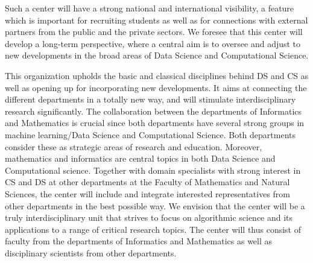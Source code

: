\documentclass[a4paper,10pt]{article}
\begin{document}
 Such a center will have a strong national and international visibility, a feature which is important for recruiting students as well as for  connections with external partners from the public and the private sectors. We foresee that this center will develop a long-term perspective, where a central aim is to oversee and adjust  to new developments in the broad areas of Data Science and Computational Science.





This organization upholds the basic and classical disciplines behind DS and CS as well as  opening up for incorporating  new developments. It aims at connecting the different departments in a totally new way, and will stimulate interdisciplinary research significantly. The collaboration between the departments of Informatics and Mathematics is crucial since both departments have several strong groups in machine learning/Data Science and Computational Science. Both departments consider these as  strategic areas of research and education. Moreover, mathematics and informatics are central topics in both Data Science and Computational science. Together with domain specialists with strong interest in CS and DS at other departments at the Faculty of Mathematics and Natural Sciences, the center will include and integrate interested representatives from other departments  in the best possible way. We envision that the center will be a truly interdisciplinary unit that strives to focus on algorithmic science and its applications to a range of critical research topics. The center will thus consist of  faculty from the departments of Informatics and Mathematics as well as disciplinary scientists from other departments. 
\vspace*{.5cm}





\end{document}
